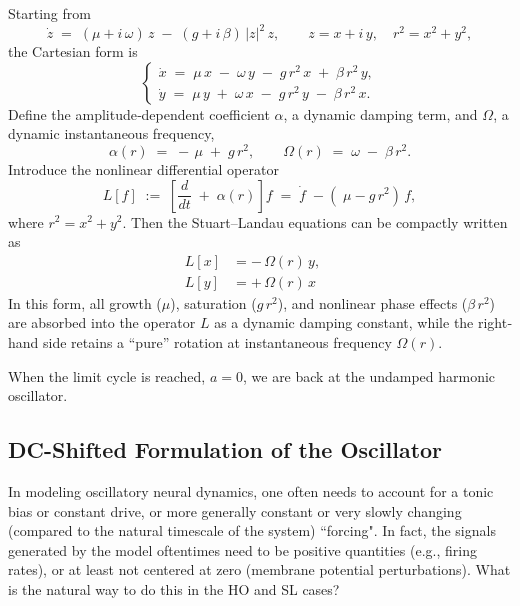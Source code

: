 Starting from
\[
\dot z \;=\; (\mu + i\,\omega)\,z \;-\; (g + i\,\beta)\,\lvert z\rvert^2\,z,
\qquad z = x + i\,y,\quad r^2 = x^2 + y^2,
\]
the Cartesian form is
\[
\begin{cases}
\dot x \;=\; \mu\,x \;-\;\omega\,y \;-\; g\,r^2\,x \;+\; \beta\,r^2\,y,\\[0.5em]
\dot y \;=\; \mu\,y \;+\;\omega\,x \;-\; g\,r^2\,y \;-\; \beta\,r^2\,x.
\end{cases}
\]
Define the amplitude‐dependent coefficient $\alpha$, a dynamic damping term, and $\Omega$, a dynamic instantaneous frequency,
\[
\alpha(r) \;=\; -\,\mu \;+\; g\,r^2,
\qquad
\Omega(r) \;=\; \omega \;-\; \beta\,r^2.
\]
Introduce the nonlinear differential operator
\[
L[f] \;:=\; \left[ \frac{d}{dt} \;+\; \alpha(r)\right] f 
\;=\; \dot f \;-(\;\mu - g\,r^2)\,f,
\]
where \(r^2 = x^2 + y^2\).  Then the Stuart–Landau equations can be compactly written as
\[
\boxed{
\begin{aligned}
L[x] &= -\,\Omega(r)\,y,\\
L[y] &= +\,\Omega(r)\,x
\end{aligned}
}
\quad
\]
In this form, all growth (\(\mu\)), saturation (\(g\,r^2\)), and nonlinear phase effects (\(\beta\,r^2\)) are absorbed into the operator \(L\) as a dynamic damping constant, while the right‐hand side retains a ``pure'' rotation at instantaneous frequency \(\Omega(r)\).

When the limit cycle is reached, $a=0$,  we are back at the undamped harmonic oscillator.
 








\subsection{DC-Shifted Formulation of the Oscillator} \label{app:shiftedoscillators}


In modeling oscillatory neural dynamics, one often needs to account for a tonic bias or constant drive, or more generally constant or very slowly changing (compared to the natural timescale of the system) ``forcing". In fact, the signals generated by the model oftentimes need to be positive quantities (e.g., firing rates), or at least not centered at zero (membrane potential perturbations). 
What is the natural way to do this in the HO and SL cases?



